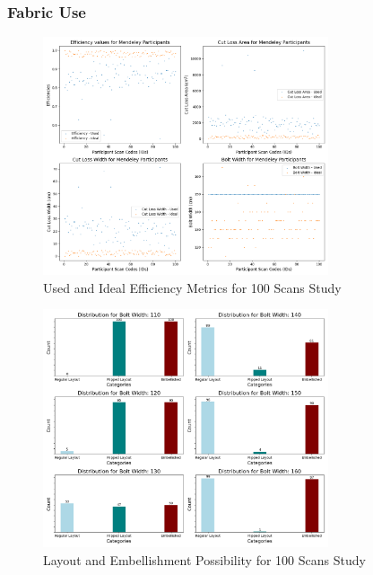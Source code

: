 \subsubsection{Fabric Use}
\begin{figure} [H] %
    \centering %
    \includegraphics[width = 0.75\textwidth]{Images/Mendeley_Plot.png} %
    \caption{Used and Ideal Efficiency Metrics for 100 Scans Study}
    \label{} %
\end{figure}

\begin{figure} [H] %
    \centering %
    \includegraphics[width = 0.75\textwidth]{Images/Mendeley_Bar.png} %
    \caption{Layout and Embellishment Possibility for 100 Scans Study}
    \label{} %
\end{figure}